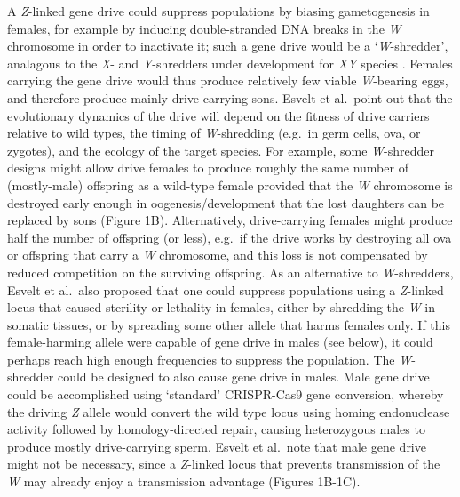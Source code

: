 \documentclass[]{rsos}%
\begin{document}
A \emph{Z}-linked gene drive could suppress populations by biasing
gametogenesis in females, for example by inducing double-stranded DNA
breaks in the \emph{W} chromosome in order to inactivate it; such a gene
drive would be a `\emph{W}-shredder', analagous to the \emph{X}- and
\emph{Y}-shredders under development for \emph{XY} species
\citep{windbichler2008ta, north2013mo, galizi2014sy, burt2018se, papathanos2018re, prowse2019}.
Females carrying the gene drive would thus produce relatively few viable
\emph{W}-bearing eggs, and therefore produce mainly drive-carrying sons.
Esvelt et al.~point out that the evolutionary dynamics of the drive will
depend on the fitness of drive carriers relative to wild types, the
timing of \emph{W}-shredding (e.g.~in germ cells, ova, or zygotes), and
the ecology of the target species. For example, some \emph{W}-shredder
designs might allow drive females to produce roughly the same number of
(mostly-male) offspring as a wild-type female provided that the \emph{W}
chromosome is destroyed early enough in oogenesis/development that the
lost daughters can be replaced by sons (Figure 1B). Alternatively,
drive-carrying females might produce half the number of offspring (or
less), e.g.~if the drive works by destroying all ova or offspring that
carry a \emph{W} chromosome, and this loss is not compensated by reduced
competition on the surviving offspring. As an alternative to
\emph{W}-shredders, Esvelt et al.~also proposed that one could suppress
populations using a \emph{Z}-linked locus that caused sterility or
lethality in females, either by shredding the \emph{W} in somatic
tissues, or by spreading some other allele that harms females only. If
this female-harming allele were capable of gene drive in males (see
below), it could perhaps reach high enough frequencies to suppress the
population. The \emph{W}-shredder could be designed to also cause gene
drive in males. Male gene drive could be accomplished using `standard'
CRISPR-Cas9 gene conversion, whereby the driving \emph{Z} allele would
convert the wild type locus using homing endonuclease activity followed
by homology-directed repair, causing heterozygous males to produce
mostly drive-carrying sperm. Esvelt et al.~note that male gene drive
might not be necessary, since a \emph{Z}-linked locus that prevents
transmission of the \emph{W} may already enjoy a transmission advantage
(Figures 1B-1C).
\end{document}
